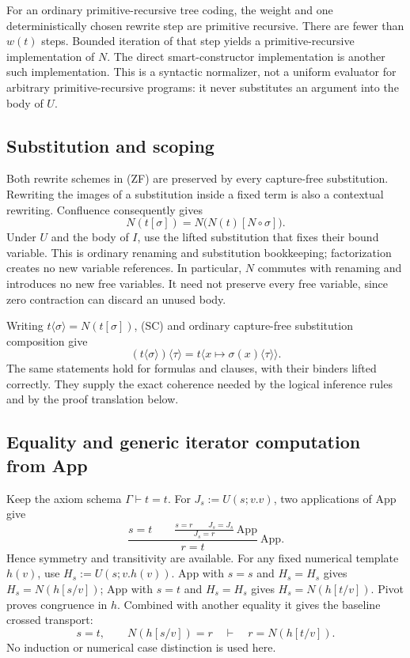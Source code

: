 For an ordinary primitive-recursive tree coding, the weight and one
deterministically chosen rewrite step are primitive recursive.  There
are fewer than $w(t)$ steps.  Bounded iteration of that step yields a
primitive-recursive implementation of $N$.  The direct smart-constructor
implementation is another such implementation.  This is a syntactic
normalizer, not a uniform evaluator for arbitrary primitive-recursive
programs: it never substitutes an argument into the body of $U$.

\subsection{Substitution and scoping}

Both rewrite schemes in (ZF) are preserved by every capture-free
substitution.  Rewriting the images of a substitution inside a fixed
term is also a contextual rewriting.  Confluence consequently gives
\[
 N(t[\sigma])=N\bigl(N(t)[N\circ\sigma]\bigr).
 \tag{SC}
\]
Under $U$ and the body of $I$, use the lifted substitution that fixes
their bound variable.  This is ordinary renaming and substitution
bookkeeping; factorization creates no new variable references.
In particular, $N$ commutes with renaming and introduces no new free
variables.  It need not preserve every free variable, since zero
contraction can discard an unused body.

Writing $t\langle\sigma\rangle=N(t[\sigma])$, (SC) and ordinary
capture-free substitution composition give
\[
 (t\langle\sigma\rangle)\langle\tau\rangle
 =t\langle x\mapsto\sigma(x)\langle\tau\rangle\rangle.
\]
The same statements hold for formulas and clauses, with their binders
lifted correctly.  They supply the exact coherence needed by the
logical inference rules and by the proof translation below.

\subsection{Equality and generic iterator computation from App}

Keep the axiom schema $\Gamma\vdash t=t$.  For
$J_s:=U(s;v.v)$, two applications of App give
\[
 \frac{s=t\qquad
       \displaystyle\frac{s=r\qquad J_s=J_s}{J_s=r}\ \mathrm{App}}
      {r=t}\ \mathrm{App}.
 \tag{Pivot}
\]
Hence symmetry and transitivity are available.  For any fixed numerical
template $h(v)$, use $H_s:=U(s;v.h(v))$.  App with $s=s$ and
$H_s=H_s$ gives $H_s=N(h[s/v])$; App with $s=t$ and $H_s=H_s$
gives $H_s=N(h[t/v])$.  Pivot proves congruence in $h$.  Combined
with another equality it gives the baseline crossed transport:
\[
 s=t,\qquad N(h[s/v])=r\quad\vdash\quad r=N(h[t/v]).
\]
No induction or numerical case distinction is used here.


